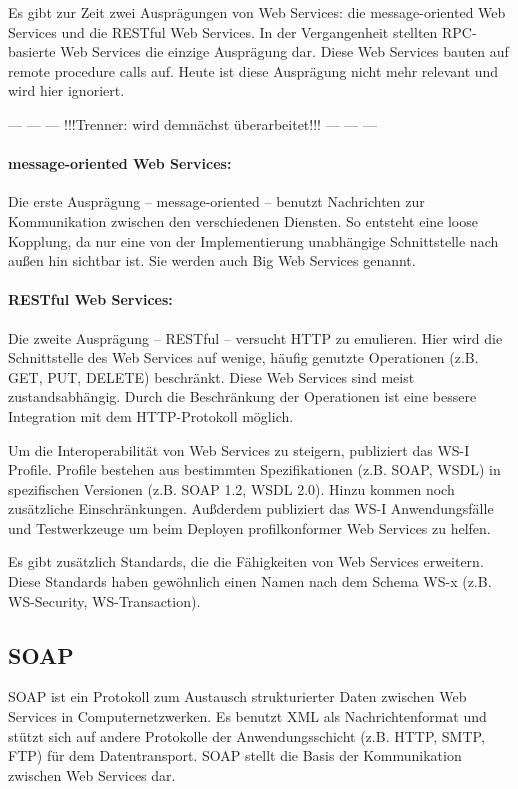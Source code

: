 \documentclass[runningheads]{llncs}
\newcommand{\germanquote}[1]{\glqq{}#1\grqq{}}
\begin{document}
    Es gibt zur Zeit zwei Ausprägungen von Web Services: die \germanquote{message-oriented Web Services} und die \germanquote{RESTful Web Services}. In der Vergangenheit stellten RPC-basierte Web Services die einzige Ausprägung dar. Diese Web Services bauten auf \germanquote{remote procedure calls} auf. Heute ist diese Ausprägung nicht mehr relevant und wird hier ignoriert.

   \begin{center}--- --- --- !!!Trenner: wird demnächst überarbeitet!!! --- --- ---\end{center}

    \paragraph{message-oriented Web Services:}
      Die erste Ausprägung -- message-oriented -- benutzt Nachrichten zur Kommunikation zwischen den verschiedenen Diensten. So entsteht eine loose Kopplung, da nur eine von der Implementierung unabhängige Schnittstelle nach außen hin sichtbar ist. Sie werden auch \germanquote{Big Web Services} genannt. %

    \paragraph{RESTful Web Services:}
      Die zweite Ausprägung -- RESTful -- versucht HTTP zu emulieren. Hier wird die Schnittstelle des Web Services auf wenige, häufig genutzte Operationen (z.B. GET, PUT, DELETE) beschränkt. Diese Web Services sind meist zustandsabhängig. Durch die Beschränkung der Operationen ist eine bessere Integration mit dem HTTP-Protokoll möglich. %

    Um die Interoperabilität von Web Services zu steigern, publiziert das WS-I\cite{wsi_hp} Profile. Profile bestehen aus bestimmten Spezifikationen (z.B. SOAP, WSDL) in spezifischen Versionen (z.B. SOAP 1.2, WSDL 2.0). Hinzu kommen noch zusätzliche Einschränkungen. Außderdem publiziert das WS-I Anwendungsfälle und Testwerkzeuge um beim Deployen profilkonformer Web Services zu helfen.

    Es gibt zusätzlich Standards, die die Fähigkeiten von Web Services erweitern. Diese Standards haben gewöhnlich einen Namen nach dem Schema \germanquote{WS-x} (z.B. WS-Security, WS-Transaction). %

  \label{soap}
  \subsection{SOAP}
  \nocite{wk_soap}
    SOAP ist ein Protokoll zum Austausch strukturierter Daten zwischen Web Services in Computernetzwerken. Es benutzt XML als Nachrichtenformat und stützt sich auf andere Protokolle der Anwendungsschicht (z.B. HTTP, SMTP, FTP) für dem Datentransport. SOAP stellt die Basis der Kommunikation zwischen Web Services dar.
\end{document}
